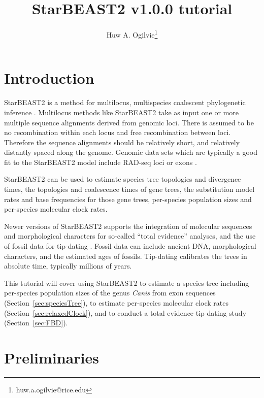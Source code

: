 \documentclass[12pt]{article}
\begin{document}
\title{StarBEAST2 v1.0.0 tutorial}
\author[1]{Huw A. Ogilvie\thanks{huw.a.ogilvie@rice.edu}}

\maketitle

\section{Introduction}
\label{sec:intro}

StarBEAST2 is a method for multilocus, multispecies coalescent phylogenetic
inference \parencite{Ogilvie2017}. Multilocus methods like StarBEAST2 take as
input one or more multiple sequence alignments derived from genomic loci.
There is assumed to be no recombination within each locus and free
recombination between loci. Therefore the sequence alignments should be
relatively short, and relatively distantly spaced along the genome. Genomic
data sets which are typically a good fit to the StarBEAST2 model include
RAD-seq loci \parencite{Ogilvie2016} or exons \parencite{Scornavacca2017}.

StarBEAST2 can be used to estimate species tree topologies and divergence
times, the topologies and coalescence times of gene trees, the substitution
model rates and base frequencies for those gene trees, per-species population
sizes and per-species molecular clock rates.

Newer versions of StarBEAST2 supports the integration of molecular sequences
and morphological characters for so-called ``total evidence'' analyses, and
the use of fossil data for tip-dating \parencite{Ogilvie2021}. Fossil data
can include ancient DNA, morphological characters, and the estimated ages of
fossils. Tip-dating calibrates the trees in absolute time, typically millions
of years.

This tutorial will cover using StarBEAST2 to estimate a species tree including
per-species population sizes of the genus \textit{Canis} from exon sequences
(Section~\ref{sec:speciesTree}),
to estimate per-species molecular clock rates
(Section~\ref{sec:relaxedClock}),
and to conduct a total evidence tip-dating study
(Section~\ref{sec:FBD}).

\section{Preliminaries}
\label{sec:prelim}
\end{document}
